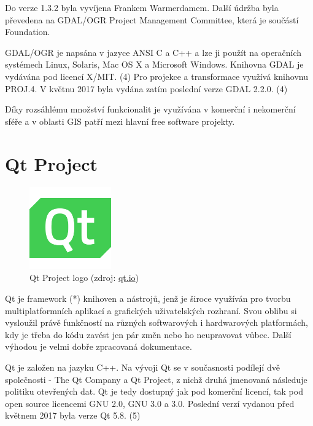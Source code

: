 Do verze 1.3.2 byla vyvíjena Frankem Warmerdamem. Další údržba byla převedena na GDAL/OGR Project Management Committee, která je součástí  Foundation. 

GDAL/OGR je napsána v jazyce ANSI C a C++ a lze ji použít na operačních systémech Linux, Solaris, Mac OS X a Microsoft Windows. Knihovna GDAL je vydávána pod licencí X/MIT. (4) Pro projekce a transformace využívá knihovnu PROJ.4. V květnu 2017 byla vydána zatím poslední verze GDAL 2.2.0. (4)

Díky rozsáhlému množství funkcionalit je využívána v komerční i nekomerční sféře a v oblasti GIS patří mezi hlavní free software projekty.


\section{Qt Project}

\begin{figure}[H]
    \centering
      \includegraphics[width=100pt]{./pictures/qt_logo_green_256x256px.png}
      \caption[Qt Project logo]{Qt Project logo 
      (zdroj: \href{http://brand.qt.io/downloads/}{qt.io})}
      \label{fig:qt}
  \end{figure}

Qt je framework (*) knihoven a nástrojů, jenž je široce využíván pro tvorbu multiplatformních aplikací a grafických uživatelských rozhraní. Svou oblibu si vysloužil právě funkčností na různých softwarových i hardwarových platformách, kdy je třeba do kódu zavést jen pár změn nebo ho neupravovat vůbec. Další výhodou je velmi dobře zpracovaná dokumentace.

Qt je založen na jazyku C++. Na vývoji Qt se v současnosti podílejí dvě společnosti - The Qt Company a Qt Project, z nichž druhá jmenovaná následuje politiku otevřených dat. Qt je tedy dostupný jak pod komerční licencí, tak pod open source licencemi GNU  2.0, GNU  3.0 a  3.0. Poslední verzí vydanou před květnem 2017 byla verze Qt 5.8. (5)



